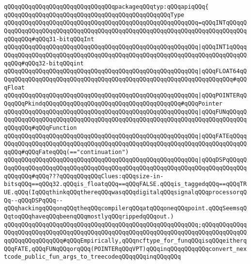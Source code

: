 \newline
\verb|qQQqqQQqqQQqqQQqqQQqqQQqqQQqqQQqpackageqQQqtyp:qQQqapiqQQq{|\newline
\verb|qQQqqQQqqQQqqQQqqQQqqQQqqQQqqQQqqQQqqQQqqQQqqQQqType|\newline
\verb|qQQqqQQqqQQqqQQqqQQqqQQqqQQqqQQqqQQqqQQqqQQqqQQqqQQqqQQq=qQQqINTqQQqqQQqqQQqqQQqqQQqqQQqqQQqqQQqqQQqqQQqqQQqqQQqqQQqqQQqqQQqqQQqqQQqqQQqqQQqqQQqqQQq#qQQq31-bitqQQqInt|\newline
\verb|qQQqqQQqqQQqqQQqqQQqqQQqqQQqqQQqqQQqqQQqqQQqqQQqqQQqqQQq|\verb#|qQQqINT1qQQqqQQqqQQqqQQqqQQqqQQqqQQqqQQqqQQqqQQqqQQqqQQqqQQqqQQqqQQqqQQqqQQqqQQqqQQqqQQq#\verb|#qQQq32-bitqQQqint|\newline
\verb|qQQqqQQqqQQqqQQqqQQqqQQqqQQqqQQqqQQqqQQqqQQqqQQqqQQqqQQq|\verb#|qQQqFLOAT64qQQqqQQqqQQqqQQqqQQqqQQqqQQqqQQqqQQqqQQqqQQqqQQqqQQqqQQqqQQqqQQqqQQq#\verb|#qQQqFloat|\newline
\verb|qQQqqQQqqQQqqQQqqQQqqQQqqQQqqQQqqQQqqQQqqQQqqQQqqQQqqQQq|\verb#|qQQqPOINTERqQQqqQQqPkindqQQqqQQqqQQqqQQqqQQqqQQqqQQqqQQqqQQqqQQq#\verb|#qQQqPointer|\newline
\verb|qQQqqQQqqQQqqQQqqQQqqQQqqQQqqQQqqQQqqQQqqQQqqQQqqQQqqQQq|\verb#|qQQqFUNqQQqqQQqqQQqqQQqqQQqqQQqqQQqqQQqqQQqqQQqqQQqqQQqqQQqqQQqqQQqqQQqqQQqqQQqqQQqqQQqqQQq#\verb|#qQQqFunction|\newline
\verb|qQQqqQQqqQQqqQQqqQQqqQQqqQQqqQQqqQQqqQQqqQQqqQQqqQQqqQQq|\verb#|qQQqFATEqQQqqQQqqQQqqQQqqQQqqQQqqQQqqQQqqQQqqQQqqQQqqQQqqQQqqQQqqQQqqQQqqQQqqQQqqQQqqQQq#\verb|#qQQqFateqQQq(=="continuation")|\newline
\verb|qQQqqQQqqQQqqQQqqQQqqQQqqQQqqQQqqQQqqQQqqQQqqQQqqQQqqQQq|\verb#|qQQqDSPqQQqqQQqqQQqqQQqqQQqqQQqqQQqqQQqqQQqqQQqqQQqqQQqqQQqqQQqqQQqqQQqqQQqqQQqqQQqqQQqqQQq#\verb|#qQQq???qQQqqQQqqQQqClues:qQQqsize-in-bitsqQQq==qQQq32.qQQqis_floatqQQq==qQQqFALSE.qQQqis_taggedqQQq==qQQqTRUE.qQQq(IqQQqthinkqQQqthereqQQqwasqQQqdigitalqQQqsignalqQQqprocessorqQQq--qQQqDSPqQQq--qQQqhackingqQQqonqQQqtheqQQqcompilerqQQqatqQQqoneqQQqpoint.qQQqSeemsqQQqtoqQQqhaveqQQqbeenqQQqmostlyqQQqrippedqQQqout.)|\newline
\verb|qQQqqQQqqQQqqQQqqQQqqQQqqQQqqQQqqQQqqQQqqQQqqQQqqQQqqQQq;qQQqqQQqqQQqqQQqqQQqqQQqqQQqqQQqqQQqqQQqqQQqqQQqqQQqqQQqqQQqqQQqqQQqqQQqqQQqqQQqqQQqqQQqqQQqqQQqqQQq#qQQqEmpirically,qQQqncftype_for_funqQQqisqQQqeitherqQQqFATE,qQQqFUNqQQqorqQQq(POINTERqQQqVPT)qQQqinqQQqqQQqqQQqconvert_nextcode_public_fun_args_to_treecodeqQQqqQQqinqQQqqQQq|\newline
